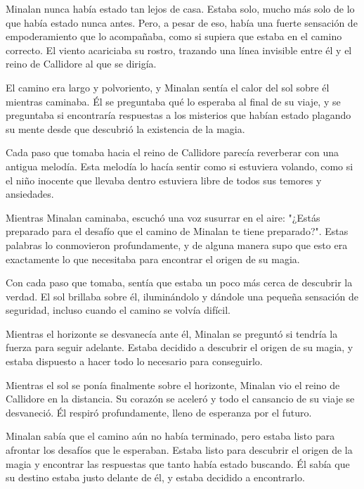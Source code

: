 
Minalan nunca había estado tan lejos de casa. Estaba solo, mucho más solo de lo que había estado nunca antes. Pero, a pesar de eso, había una fuerte sensación de empoderamiento que lo acompañaba, como si supiera que estaba en el camino correcto. El viento acariciaba su rostro, trazando una línea invisible entre él y el reino de Callidore al que se dirigía.

El camino era largo y polvoriento, y Minalan sentía el calor del sol sobre él mientras caminaba. Él se preguntaba qué lo esperaba al final de su viaje, y se preguntaba si encontraría respuestas a los misterios que habían estado plagando su mente desde que descubrió la existencia de la magia.

Cada paso que tomaba hacia el reino de Callidore parecía reverberar con una antigua melodía. Esta melodía lo hacía sentir como si estuviera volando, como si el niño inocente que llevaba dentro estuviera libre de todos sus temores y ansiedades.

Mientras Minalan caminaba, escuchó una voz susurrar en el aire: "¿Estás preparado para el desafío que el camino de Minalan te tiene preparado?". Estas palabras lo conmovieron profundamente, y de alguna manera supo que esto era exactamente lo que necesitaba para encontrar el origen de su magia.

Con cada paso que tomaba, sentía que estaba un poco más cerca de descubrir la verdad. El sol brillaba sobre él, iluminándolo y dándole una pequeña sensación de seguridad, incluso cuando el camino se volvía difícil.

Mientras el horizonte se desvanecía ante él, Minalan se preguntó si tendría la fuerza para seguir adelante. Estaba decidido a descubrir el origen de su magia, y estaba dispuesto a hacer todo lo necesario para conseguirlo.

Mientras el sol se ponía finalmente sobre el horizonte, Minalan vio el reino de Callidore en la distancia. Su corazón se aceleró y todo el cansancio de su viaje se desvaneció. Él respiró profundamente, lleno de esperanza por el futuro.

Minalan sabía que el camino aún no había terminado, pero estaba listo para afrontar los desafíos que le esperaban. Estaba listo para descubrir el origen de la magia y encontrar las respuestas que tanto había estado buscando. Él sabía que su destino estaba justo delante de él, y estaba decidido a encontrarlo.